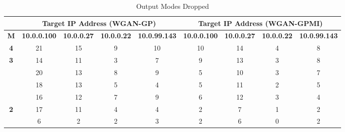 \begin{table}[!htbp]
	\centering
	\caption{Output Modes Dropped}
	\label{tab:output_modes}
	\begin{adjustbox}{angle=90}
		\begin{tabular}{ccccccccc}
			\multicolumn{1}{c|}{} & \multicolumn{4}{c|}{\textbf{Target IP Address (WGAN-GP)}} & \multicolumn{4}{c}{\textbf{Target IP Address (WGAN-GPMI)}} \\ \hline
			\multicolumn{1}{c|}{\textbf{M}} & \multicolumn{1}{l|}{\textbf{10.0.0.100}} & \multicolumn{1}{l|}{\textbf{10.0.0.27}} & \multicolumn{1}{l|}{\textbf{10.0.0.22}} & \multicolumn{1}{l|}{\textbf{10.0.99.143}} & \multicolumn{1}{l|}{\textbf{10.0.0.100}} & \multicolumn{1}{l|}{\textbf{10.0.0.27}} & \multicolumn{1}{l|}{\textbf{10.0.0.22}} & \multicolumn{1}{l}{\textbf{10.0.99.143}} \\ \hline
			\multicolumn{1}{c|}{\textbf{4}} & \multicolumn{1}{c|}{21} & \multicolumn{1}{c|}{15} & \multicolumn{1}{c|}{9} & \multicolumn{1}{c|}{10} & \multicolumn{1}{c|}{10} & \multicolumn{1}{c|}{14} & \multicolumn{1}{c|}{4} & 8 \\ \hline
			\multicolumn{1}{c|}{\multirow{4}{*}{\textbf{3}}} & \multicolumn{1}{c|}{14} & \multicolumn{1}{c|}{11} & \multicolumn{1}{c|}{3} & \multicolumn{1}{c|}{7} & \multicolumn{1}{c|}{9} & \multicolumn{1}{c|}{13} & \multicolumn{1}{c|}{3} & 8 \\
			\multicolumn{1}{c|}{} & \multicolumn{1}{c|}{20} & \multicolumn{1}{c|}{13} & \multicolumn{1}{c|}{8} & \multicolumn{1}{c|}{9} & \multicolumn{1}{c|}{5} & \multicolumn{1}{c|}{10} & \multicolumn{1}{c|}{3} & 7 \\
			\multicolumn{1}{c|}{} & \multicolumn{1}{c|}{18} & \multicolumn{1}{c|}{13} & \multicolumn{1}{c|}{5} & \multicolumn{1}{c|}{4} & \multicolumn{1}{c|}{5} & \multicolumn{1}{c|}{11} & \multicolumn{1}{c|}{2} & 5 \\
			\multicolumn{1}{c|}{} & \multicolumn{1}{c|}{16} & \multicolumn{1}{c|}{12} & \multicolumn{1}{c|}{7} & \multicolumn{1}{c|}{9} & \multicolumn{1}{c|}{6} & \multicolumn{1}{c|}{12} & \multicolumn{1}{c|}{3} & 4 \\ \hline
			\multicolumn{1}{c|}{\multirow{6}{*}{\textbf{2}}} & \multicolumn{1}{c|}{17} & \multicolumn{1}{c|}{11} & \multicolumn{1}{c|}{4} & \multicolumn{1}{c|}{4} & \multicolumn{1}{c|}{2} & \multicolumn{1}{c|}{7} & \multicolumn{1}{c|}{1} & 2 \\
			\multicolumn{1}{c|}{} & \multicolumn{1}{c|}{6} & \multicolumn{1}{c|}{2} & \multicolumn{1}{c|}{2} & \multicolumn{1}{c|}{3} & \multicolumn{1}{c|}{2} & \multicolumn{1}{c|}{6} & \multicolumn{1}{c|}{0} & 2 \\

\end{tabular}
\end{adjustbox}
\end{table}
